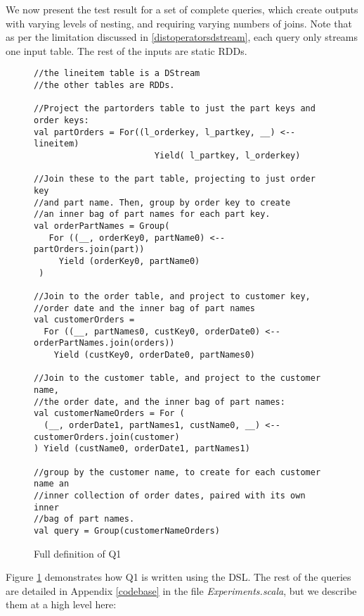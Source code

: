 We now present the test result for a set of complete queries, which create outputs with varying levels of nesting, and requiring varying numbers of joins. Note that as per the limitation discussed in \ref{distoperatorsdstream}, each query only streams one input table. The rest of the inputs are static RDDs.
\begin{figure}
\begin{lstlisting}
//the lineitem table is a DStream
//the other tables are RDDs.

//Project the partorders table to just the part keys and order keys:
val partOrders = For((l_orderkey, l_partkey, __) <-- lineitem)
                        Yield( l_partkey, l_orderkey)

//Join these to the part table, projecting to just order key
//and part name. Then, group by order key to create 
//an inner bag of part names for each part key.
val orderPartNames = Group(
   For ((__, orderKey0, partName0) <-- partOrders.join(part))
     Yield (orderKey0, partName0)
 )

//Join to the order table, and project to customer key, 
//order date and the inner bag of part names
val customerOrders =
  For ((__, partNames0, custKey0, orderDate0) <-- orderPartNames.join(orders))
    Yield (custKey0, orderDate0, partNames0)

//Join to the customer table, and project to the customer name,
//the order date, and the inner bag of part names:
val customerNameOrders = For (
  (__, orderDate1, partNames1, custName0, __) <-- customerOrders.join(customer)
) Yield (custName0, orderDate1, partNames1)

//group by the customer name, to create for each customer name an 
//inner collection of order dates, paired with its own inner 
//bag of part names.
val query = Group(customerNameOrders)
\end{lstlisting}
\label{Q1}
\caption{Full definition of Q1}
\end{figure}

Figure \ref{Q1} demonstrates how Q1 is written using the DSL. The rest of the queries are detailed in Appendix \ref{codebase} in the file \textit{Experiments.scala}, but we describe them at a high level here:


